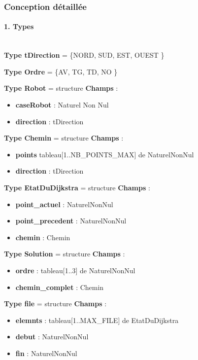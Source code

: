 \documentclass[11pt,a4paper]{article}
\begin{document}
\newpage
\subsubsection{Conception détaillée}

\paragraph{1. Types}\mbox{} \\[5pt] 
\noindent\textbf{Type tDirection} = \{NORD, SUD, EST, OUEST \}
\medskip

\noindent\textbf{Type Ordre} = \{AV, TG, TD, NO \}
\medskip

\noindent\textbf{Type Robot} = structure
\medskip
\noindent\textbf{Champs} :
\begin{itemize}
    \item \textbf{caseRobot} : Naturel Non Nul
    \item \textbf{direction} : tDirection
\end{itemize} 

\noindent\textbf{Type Chemin} = structure
\medskip
\noindent\textbf{Champs} :
\begin{itemize}
    \item \textbf{points} tableau[1..NB\_POINTS\_MAX] de NaturelNonNul
    \item \textbf{direction} : tDirection
\end{itemize} 

\noindent\textbf{Type EtatDuDijkstra} = structure
\medskip
\noindent\textbf{Champs} :
\begin{itemize}
    \item \textbf{point\_actuel} : NaturelNonNul
    \item \textbf{point\_precedent} : NaturelNonNul
    \item \textbf{chemin} : Chemin
\end{itemize} 

\noindent\textbf{Type Solution} = structure
\medskip
\noindent\textbf{Champs} :
\begin{itemize}
    \item \textbf{ordre} : tableau[1..3] de NaturelNonNul
    \item \textbf{chemin\_complet} : Chemin
\end{itemize} 

\noindent\textbf{Type file} = structure
\medskip
\noindent\textbf{Champs} :
\begin{itemize}
    \item \textbf{elemnts} : tableau[1..MAX\_FILE] de EtatDuDijkstra
    \item \textbf{debut} : NaturelNonNul
    \item \textbf{fin} : NaturelNonNul
\end{itemize}
\end{document}
